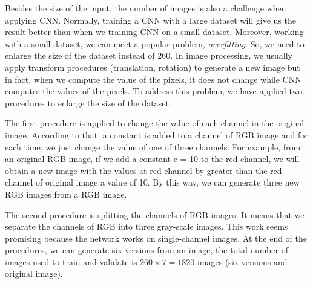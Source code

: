 \documentclass[10pt]{article}
\begin{document}
Besides the size of the input, the number of images is also a challenge when applying CNN. Normally, training a CNN with a large dataset will give us the result better than when we training CNN on a small dataset. Moreover, working with a small dataset, we can meet a popular problem, \textit{overfitting}. So, we need to enlarge the size of the dataset instead of $260$. In image processing, we usually apply transform procedures (translation, rotation) to generate a new image but in fact, when we compute the value of the pixels, it does not change while CNN computes the values of the pixels. To address this problem, we have applied two procedures to enlarge the size of the dataset.

The first procedure is applied to change the value of each
channel in the original image. According to that, a constant is
added to a channel of RGB image and for each time, we just
change the value of one of three channels. For example, from
an original RGB image, if we add a constant c = 10 to the
red channel, we will obtain a new image with the values at
red channel by greater than the red channel of original image
a value of 10. By this way, we can generate three new RGB
images from a RGB image.

The second procedure is splitting the channels of RGB
images. It means that we separate the channels of RGB into
three gray-scale images. This work seems promising because
the network works on single-channel images. At the end of the procedures, we
can generate six versions from an image, the total number of
images used to train and validate is $260 \times 7 = 1820$ images
(six versions and original image).
\end{document}

